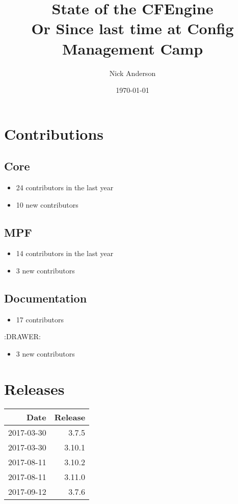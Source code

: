 \documentclass[11pt]{article}
\author{Nick Anderson}
\date{\today}
\title{State of the CFEngine\\\medskip
\large Or Since last time at Config Management Camp}
\begin{document}
\maketitle
\section*{Contributions}
\label{sec:org7a16ba1}
\subsection*{Core}
\label{sec:orgea96256}

\begin{itemize}
\item 24 contributors in the last year
\end{itemize}
\begin{itemize}
\item 10 new contributors
\end{itemize}

\subsection*{MPF}
\label{sec:org54110d5}
\begin{itemize}
\item 14 contributors in the last year
\end{itemize}
\begin{itemize}
\item 3 new contributors
\end{itemize}

\subsection*{Documentation}
\label{sec:org6df8c25}
\begin{itemize}
\item 17 contributors
\end{itemize}
:DRAWER:
\begin{itemize}
\item 3 new contributors
\end{itemize}

\section*{Releases}
\label{sec:orgf0065b6}

\begin{center}
\begin{tabular}{rr}
Date & Release\\
\hline
2017-03-30 & 3.7.5\\
2017-03-30 & 3.10.1\\
2017-08-11 & 3.10.2\\
2017-08-11 & 3.11.0\\
2017-09-12 & 3.7.6\\
\end{tabular}
\end{center}
\end{document}
